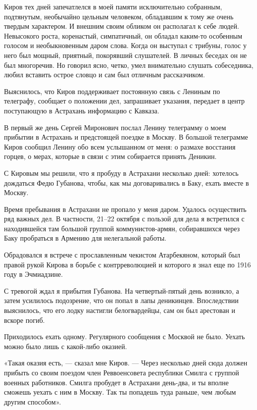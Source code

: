 \documentclass[12pt, a4paper, openany]{book}
\begin{document}
Киров тех дней запечатлелся в моей памяти исключительно собранным, подтянутым, необычайно цельным человеком, обладавшим к тому же очень твердым характером. И внешним своим обликом он располагал к себе людей. Невысокого роста, коренастый, симпатичный, он обладал каким-то особенным голосом и необыкновенным даром слова. Когда он выступал с трибуны, голос у него был мощный, приятный, покорявший слушателей. В личных беседах он не был многоречив. Но говорил ясно, четко, умел внимательно слушать собеседника, любил вставить острое словцо и сам был отличным рассказчиком.

Выяснилось, что Киров поддерживает постоянную связь с Лениным по телеграфу, сообщает о положении дел, запрашивает указания, передает в центр поступающую в Астрахань информацию с Кавказа.

В первый же день Сергей Миронович послал Ленину телеграмму о моем прибытии в Астрахань и предстоящей поездке в Москву. В большой телеграмме Киров сообщил Ленину обо всем услышанном от меня: о размахе восстания горцев, о мерах, которые в связи с этим собирается принять Деникин.

С Кировым мы решили, что я пробуду в Астрахани несколько дней: хотелось дождаться Федю Губанова, чтобы, как мы договаривались в Баку, ехать вместе в Москву.

Время пребывания в Астрахани не пропало у меня даром. Удалось осуществить ряд важных дел. В частности, 21–22 октября с пользой для дела я встретился с находившейся там большой группой коммунистов-армян, собиравшихся через Баку пробраться в Армению для нелегальной работы.

Обрадовался я встрече с прославленным чекистом Атарбекяном, который был правой рукой Кирова в борьбе с контрреволюцией и которого я знал еще по 1916 году в Эчмиадзине.

С тревогой ждал я прибытия Губанова. На четвертый-пятый день возникло, а затем усилилось подозрение, что он попал в лапы деникинцев. Впоследствии выяснилось, что его лодку настигли белогвардейцы, сам он был арестован и вскоре погиб.

Приходилось ехать одному. Регулярного сообщения с Москвой не было. Уехать можно было лишь с какой-либо оказией.

«Такая оказия есть, — сказал мне Киров. — Через несколько дней сюда должен прибыть со своим поездом член Реввоенсовета республики Смилга с группой военных работников. Смилга пробудет в Астрахани день-два, и ты вполне сможешь уехать с ним в Москву. Так ты попадешь туда раньше, чем любым другим способом».
\end{document}
